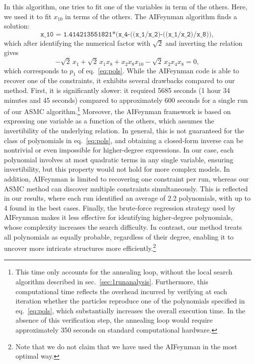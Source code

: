 \documentclass[11pt,a4paper]{article}
\begin{document}
In this algorithm, one tries to fit one of the variables in term of the others. Here, we used it to fit $x_{10}$ in terms of the others. The AIFeynman algorithm finds a solution: 
\begin{equation}
	\texttt{x\_10 = 1.414213551821*(x\_4-((x\_1/x\_2)-((x\_1/x\_2)/x\_8))},
\end{equation}
which after identifying the numerical factor with $\sqrt 2$ and inverting the relation gives 
\begin{equation}
	- \sqrt 2\, x_1 + \sqrt 2\, x_1 x_8 + x_2 x_8  x_{10} -\sqrt 2\, x_2 x_4 x_8 = 0,
\end{equation}
which corresponds to $p_1$ of eq.~\eqref{eq:pols}. While the AIFeynman code is able to recover one of the constraints, it exhibits several drawbacks compared to our method. First, it is significantly slower: it required 5685 seconds (1 hour 34 minutes and 45 seconds) compared to approximately 600 seconds for a single run of our ASMC algorithm.\footnote{This time only accounts for the annealing loop, without the local search algorithm described in sec.~\ref{sec:1runanalysis}. Furthermore, this computational time reflects the overhead incurred by verifying at each iteration whether the particles reproduce one of the polynomials specified in eq.~\eqref{eq:pols}, which substantially increases the overall execution time. In the absence of this verification step, the annealing loop would require approximately 350 seconds on standard computational hardware.} Moreover, the AIFeynman framework is based on expressing one variable as a function of the others, which assumes the invertibility of the underlying relation. In general, this is not guaranteed for the class of polynomials in eq.~\eqref{eq:pols}, and obtaining a closed-form inverse can be nontrivial or even impossible for higher-degree expressions. In our case, each polynomial involves at most quadratic terms in any single variable, ensuring invertibility, but this property would not hold for more complex models. In addition, AIFeynman is limited to recovering one constraint per run, whereas our ASMC method can discover multiple constraints simultaneously. This is reflected in our results, where each run identified an average of 2.2 polynomials, with up to 4 found in the best cases. Finally, the brute-force regression strategy used by AIFeynman makes it less effective for identifying higher-degree polynomials, whose complexity increases the search difficulty. In contrast, our method treats all polynomials as equally probable, regardless of their degree, enabling it to uncover more intricate structures more efficiently.\footnote{Note that we do not claim that we have used the AIFeynman in the most optimal way.}
\end{document}
